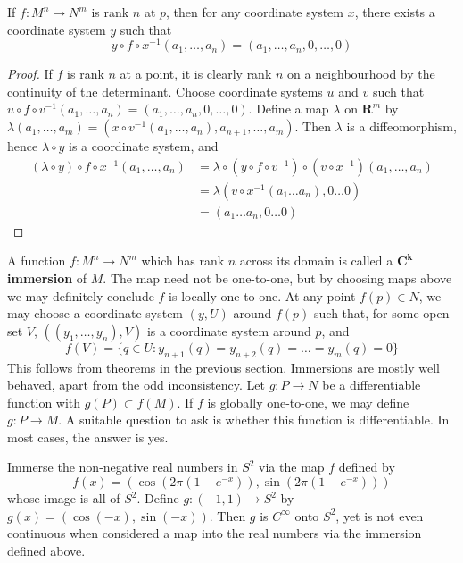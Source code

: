 \begin{corollary}
    If $f: M^n \to N^m$ is rank $n$ at $p$, then for any coordinate system $x$, there exists a coordinate system $y$ such that
    \[ y \circ f \circ x^{-1} (a_1, \dots, a_n) = (a_1, \dots, a_n, 0, \dots, 0) \]
\end{corollary}
\begin{proof}
    If $f$ is rank $n$ at a point, it is clearly rank $n$ on a neighbourhood by the continuity of the determinant. Choose coordinate systems $u$ and $v$ such that $u \circ f \circ v^{-1}(a_1, \dots, a_n) = (a_1, \dots, a_n, 0, \dots, 0)$. Define a map $\lambda$ on $\mathbf{R}^m$ by $\lambda(a_1, \dots, a_m) = (x \circ v^{-1}(a_1, \dots, a_n), a_{n+1}, \dots, a_m)$. Then $\lambda$ is a diffeomorphism, hence $\lambda \circ y$ is a coordinate system, and
    \begin{align*}
        (\lambda \circ y) \circ f \circ x^{-1} (a_1, \dots, a_n) &= \lambda \circ (y \circ f \circ v^{-1}) \circ (v \circ x^{-1}) (a_1, \dots, a_n)\\
        &= \lambda (v \circ x^{-1} (a_1 \dots a_n), 0 \dots 0)\\
        &= (a_1 \dots a_n, 0 \dots 0)
    \end{align*}
\end{proof}

A function $f:M^n \to N^m$ which has rank $n$ across its domain is called a {\bf $\mathbf{C^k}$ immersion} of $M$. The map need not be one-to-one, but by choosing maps above we may definitely conclude $f$ is locally one-to-one. At any point $f(p) \in N$, we may choose a coordinate system $(y,U)$ around $f(p)$ such that, for some open set $V$, $((y_1, \dots, y_n),V)$ is a coordinate system around $p$, and
%
\[ f(V) = \{ q \in U : y_{n+1}(q) = y_{n+2}(q) = \dots = y_m(q) = 0 \} \]
%
This follows from theorems in the previous section. Immersions are mostly well behaved, apart from the odd inconsistency. Let $g:P \to N$ be a differentiable function with $g(P) \subset f(M)$. If $f$ is globally one-to-one, we may define $g:P \to M$. A suitable question to ask is whether this function is differentiable. In most cases, the answer is yes.

\begin{example}
    Immerse the non-negative real numbers in $S^2$ via the map $f$ defined by
    \[ f(x) = (\cos(2\pi(1 - e^{-x})), \sin(2\pi(1 - e^{-x}))) \]
    whose image is all of $S^2$. Define $g:(-1,1) \to S^2$ by $g(x) = (\cos(-x), \sin(-x))$. Then $g$ is $C^\infty$ onto $S^2$, yet is not even continuous when considered a map into the real numbers via the immersion defined above.
\end{example}

